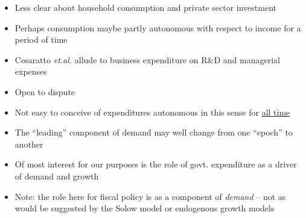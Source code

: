 \documentclass{article}
\begin{document}
\begin{itemize}
		\item Less clear about household consumption and private sector investment
		\item Perhaps consumption maybe partly autonomous with respect to income for a period of time
		\item Cesaratto \textit{et.al.} allude to business expenditure on R\&D and managerial expenses
		\item Open to dispute 
		\item Not easy to conceive of expenditures autonomous in this sense for \underline{all time}
		\item The ``leading'' component of demand may well change from one ``epoch'' to another
		\item Of most interest for our purposes is the role of govt. expenditure as a driver of demand and growth
		\item Note: the role here for fiscal policy is as a component of \textit{demand} -- not as would be suggested by the Solow model or endogenous growth models 
	\end{itemize}
\end{document}

